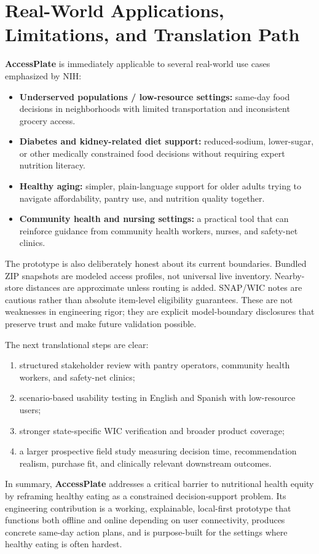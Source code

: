 \documentclass[11pt,letterpaper]{article}
\newcommand{\app}{\textbf{AccessPlate}}
\begin{document}
\section{Real-World Applications, Limitations, and Translation Path}
\app{} is immediately applicable to several real-world use cases emphasized by NIH:
\begin{itemize}
\item \textbf{Underserved populations / low-resource settings:} same-day food decisions in neighborhoods with limited transportation and inconsistent grocery access.
\item \textbf{Diabetes and kidney-related diet support:} reduced-sodium, lower-sugar, or other medically constrained food decisions without requiring expert nutrition literacy.
\item \textbf{Healthy aging:} simpler, plain-language support for older adults trying to navigate affordability, pantry use, and nutrition quality together.
\item \textbf{Community health and nursing settings:} a practical tool that can reinforce guidance from community health workers, nurses, and safety-net clinics.
\end{itemize}

The prototype is also deliberately honest about its current boundaries. Bundled ZIP snapshots are modeled access profiles, not universal live inventory. Nearby-store distances are approximate unless routing is added. SNAP/WIC notes are cautious rather than absolute item-level eligibility guarantees. These are not weaknesses in engineering rigor; they are explicit model-boundary disclosures that preserve trust and make future validation possible.

The next translational steps are clear:
\begin{enumerate}
\item structured stakeholder review with pantry operators, community health workers, and safety-net clinics;
\item scenario-based usability testing in English and Spanish with low-resource users;
\item stronger state-specific WIC verification and broader product coverage;
\item a larger prospective field study measuring decision time, recommendation realism, purchase fit, and clinically relevant downstream outcomes.
\end{enumerate}

In summary, \app{} addresses a critical barrier to nutritional health equity by reframing healthy eating as a constrained decision-support problem. Its engineering contribution is a working, explainable, local-first prototype that functions both offline and online depending on user connectivity, produces concrete same-day action plans, and is purpose-built for the settings where healthy eating is often hardest.
\end{document}
